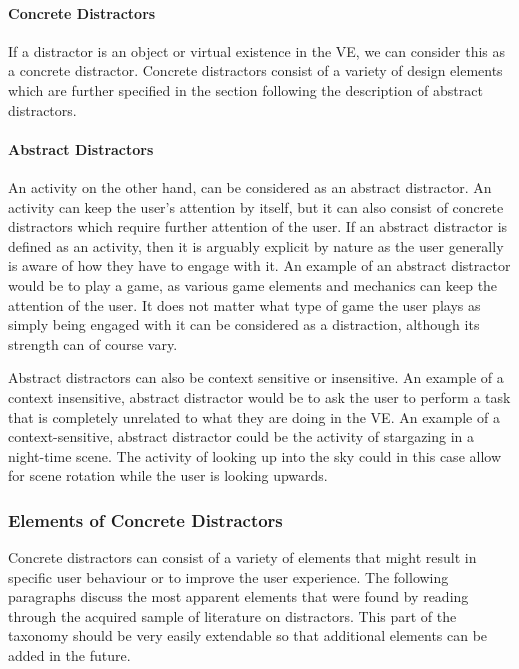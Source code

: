 \paragraph{Concrete Distractors}
If a distractor is an object or virtual existence in the VE, we can consider this as a concrete distractor. Concrete distractors consist of a variety of design elements which are further specified in the section following the description of abstract distractors. 

\paragraph{Abstract Distractors}
An activity on the other hand, can be considered as an abstract distractor. An activity can keep the user's attention by itself, but it can also consist of concrete distractors which require further attention of the user. If an abstract distractor is defined as an activity, then it is arguably explicit by nature as the user generally is aware of how they have to engage with it. An example of an abstract distractor would be to play a game, as various game elements and mechanics can keep the attention of the user. It does not matter what type of game the user plays as simply being engaged with it can be considered as a distraction, although its strength can of course vary. 

Abstract distractors can also be context sensitive or insensitive. An example of a context insensitive, abstract distractor would be to ask the user to perform a task that is completely unrelated to what they are doing in the VE. An example of a context-sensitive, abstract distractor could be the activity of stargazing in a night-time scene. The activity of looking up into the sky could in this case allow for scene rotation while the user is looking upwards.

\subsubsection{Elements of Concrete Distractors}
Concrete distractors can consist of a variety of elements that might result in specific user behaviour or to improve the user experience. The following paragraphs discuss the most apparent elements that were found by reading through the acquired sample of literature on distractors. This part of the taxonomy should be very easily extendable so that additional elements can be added in the future. 


